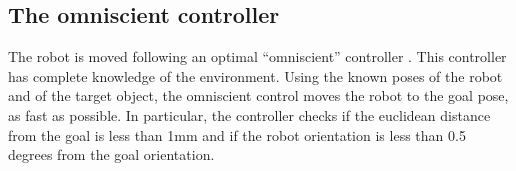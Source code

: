\subsection{The omniscient controller}

The robot is moved following an optimal “omniscient” controller \cite{park2011smooth}. This controller has complete 
knowledge of the environment. Using the known poses of the robot and of the target object, the omniscient control moves 
the robot to the goal pose, as fast as possible. In particular, the controller checks if the euclidean distance from 
the goal is less than 1mm and if the robot orientation is less than 0.5 degrees from the goal orientation.
